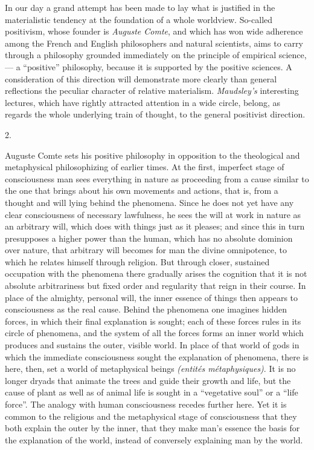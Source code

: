 \documentclass[12pt,a4paper,openany]{book}
\newcommand{\secnum}[1]{\par\begin{center}#1\end{center}\par\nobreak}
\newcommand{\opage}[1]{\marginnote{\footnotesize\textit{[#1]}}}
\begin{document}
In our day a grand attempt has been made to
lay what is justified in the materialistic tendency at the foundation
of a whole worldview. So-called positivism,
whose founder is \emph{Auguste Comte}, and which has won
wide adherence among the French and English philosophers and
natural scientists, aims to carry through a philosophy grounded
immediately on the principle of empirical science, ---
a ``positive'' philosophy, because it is supported by the positive
sciences. A consideration of this direction will demonstrate more clearly
than general reflections the peculiar character of relative materialism.
\emph{Maudsley's} interesting lectures,
which have rightly attracted attention in a wide
circle, belong, as regards the whole underlying train of thought,
to the general positivist direction.
\opage{200}\secnum{2.}

Auguste Comte sets his positive philosophy in opposition
to the theological and metaphysical philosophizing of earlier times.
At the first, imperfect stage of consciousness man sees
everything in nature as proceeding from a cause similar to the one that
brings about his own movements and actions, that is, from a
thought and will lying behind the phenomena. Since he
does not yet have any clear consciousness of necessary lawfulness,
he sees the will at work in nature as an arbitrary
will, which does with things just as it pleases; and since
this in turn presupposes a higher power than the human,
which has no absolute dominion over nature,
that arbitrary will becomes for man the divine omnipotence,
to which he relates himself through religion.
But through closer, sustained occupation with the phenomena
there gradually arises the cognition that it is not
absolute arbitrariness but fixed order and regularity that reign
in their course. In place of the almighty, personal
will, the inner essence of things then appears to consciousness
as the real cause. Behind the phenomena one imagines
hidden forces, in which their final explanation
is sought; each of these forces rules in its circle of phenomena,
and the system of all the forces forms an inner
world which produces and sustains the outer, visible
world. In place of that world of gods in which the
immediate consciousness sought the explanation of phenomena,
there is here, then, set a world of metaphysical beings \textit{(entités métaphysiques)}.
It is no longer dryads that animate
the trees and guide their growth and life, but the cause of
plant as well as of animal life is sought in a ``vegetative soul''
or a ``life force''. The analogy with human consciousness
recedes further here. Yet it is common
to the religious and the metaphysical stage of consciousness that they
both explain the outer by the inner, that they make man's
essence the basis for the explanation of the world, instead of
conversely explaining man by the world.
\end{document}

